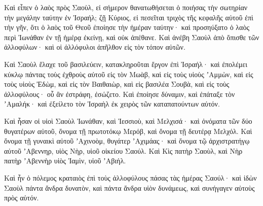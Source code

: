 {Καὶ εἶπεν ὁ λαὸς πρὸς Σαοὺλ, εἰ σήμερον θανατωθήσεται ὁ ποιήσας τὴν σωτηρίαν τὴν μεγάλην ταύτην ἐν Ἰσραήλ; ζῇ Κύριος, εἰ πεσεῖται τριχὸς τῆς κεφαλῆς αὐτοῦ ἐπὶ τὴν γῆν, ὅτι ὁ λαὸς τοῦ Θεοῦ ἐποίησε τὴν ἡμέραν ταύτην· καὶ προσηύξατο ὁ λαὸς περὶ Ἰωνάθαν ἐν τῇ ἡμέρᾳ ἐκείνῃ, καὶ οὐκ ἀπέθανε.
Καὶ ἀνέβη Σαοὺλ ἀπὸ ὄπισθε τῶν ἀλλοφύλων· καὶ οἱ ἀλλόφυλοι ἀπῆλθον εἰς τὸν τόπον αὐτῶν.
\par }{\PP {}Καὶ Σαοὺλ ἔλαχε τοῦ βασιλεύειν, κατακληροῦται ἔργον ἐπὶ Ἰσραήλ· καὶ ἐπολέμει κύκλῳ πάντας τοὺς ἐχθροὺς αὐτοῦ εἰς τὸν Μωὰβ, καὶ εἰς τοὺς υἱοὺς ʼΑμμὼν, καὶ εἰς τοὺς υἱοὺς Ἐδὼμ, καὶ εἰς τὸν Βαιθαιὼρ, καὶ εἰς βασιλέα Σουβὰ, καὶ εἰς τοὺς ἀλλοφύλους· οὗ ἂν ἐστράφη, ἐσώζετο.
Καὶ ἐποίησε δύναμιν, καὶ ἐπάταξε τὸν ʼΑμαλήκ· καὶ ἐξείλετο τὸν Ἰσραὴλ ἐκ χειρὸς τῶν καταπατούντων αὐτόν.
\par }{\PP {}Καὶ ἦσαν οἱ υἱοὶ Σαοὺλ Ἰωνάθαν, καὶ Ἰεσσιοὺ, καὶ Μελχισά· καὶ ὀνόματα τῶν δύο θυγατέρων αὐτοῦ, ὄνομα τῇ πρωτοτόκῳ Μερόβ, καὶ ὄνομα τῇ δευτέρᾳ Μελχόλ.
Καὶ ὄνομα τῇ γυναικὶ αὐτοῦ ʼΑχινοὸμ, θυγάτερ ʼΑχιμάας· καὶ ὄνομα τῷ ἀρχιστρατήγῳ αὐτοῦ ʼΑβεννηρ, υἱὸς Νὴρ, υἱοῦ οἰκείου Σαούλ.
Καὶ Κὶς πατὴρ Σαοὺλ, καὶ Νὴρ πατὴρ ʼΑβεννὴρ υἱὸς Ἰαμὶν, υἱοῦ ʼΑβιήλ.
\par }{\PP {}Καὶ ἦν ὁ πόλεμος κραταιὸς ἐπὶ τοὺς ἀλλοφύλους πάσας τὰς ἡμέρας Σαούλ· καὶ ἰδὼν Σαοὺλ πάντα ἄνδρα δυνατὸν, καὶ πάντα ἄνδρα υἱὸν δυνάμεως, καὶ συνήγαγεν αὐτοὺς πρὸς αὑτόν.

}
